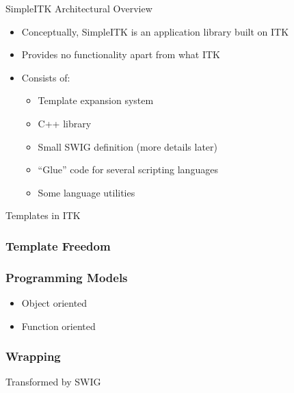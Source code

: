 \begin{frame}{SimpleITK Architectural Overview}
\begin{itemize}
\item Conceptually, SimpleITK is an application library built on ITK
\item Provides no functionality apart from what ITK
\item Consists of:
  \begin{itemize}
    \item Template expansion system
    \item C++ library
    \item Small SWIG definition (more details later)
    \item ``Glue'' code for several scripting languages
    \item Some language utilities
  \end{itemize}
\end{itemize}
\end{frame}

\begin{frame}{Templates in ITK}
\begin{center}
\lstcpp

\end{center}
\end{frame}

\begin{frame}
\frametitle{Template Freedom}
\end{frame}

\begin{frame}
\frametitle{Programming Models}
\begin{itemize}
\item Object oriented
\item Function oriented
\end{itemize}
\end{frame}

\begin{frame}
\frametitle{Wrapping}
Transformed by SWIG
\end{frame}





